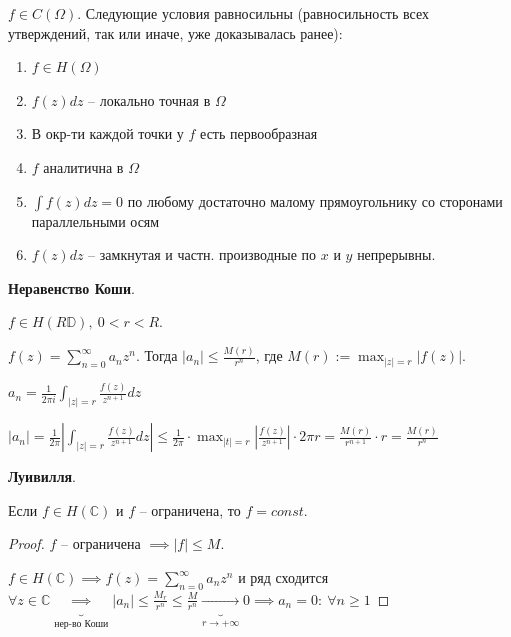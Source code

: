\begin{theorem}
    $f \in C(\Omega)$. Следующие условия равносильны (равносильность всех утверждений, так или иначе, уже доказывалась ранее):

    \begin{enumerate}
        \item {
            $f \in H(\Omega)$
        }
        \item {
            $f(z) dz$ -- локально точная в $\Omega$
        }
        \item {
            В окр-ти каждой точки у $f$ есть первообразная
        }
        \item {
            $f$ аналитична в $\Omega$
        }
        \item {
            $\int{f(z) dz} = 0$ по любому достаточно малому прямоугольнику со сторонами параллельными осям
        }
        \item {
            $f(z) dz$ -- замкнутая и частн. производные по $x$ и $y$ непрерывны.
        }
    \end{enumerate}
\end{theorem}

\begin{theorem}
    \textbf{Неравенство Коши}.

    $f \in H(R \mathbb{D}), \ 0 < r < R$.

    $f(z) = \sum_{n=0}^{\infty} {a_n z^n}$. Тогда $|a_n| \leq \frac{M(r)}{r^n}$, где $M(r) := \max_{|z| = r} |f(z)|$.
\end{theorem}
\begin{theorem}
    $a_n = \frac{1}{2 \pi i} \int_{|z| = r} { \frac{f(z)}{z^{n + 1}} dz }$

    $|a_n| = \frac{1}{2 \pi} \left| \int_{|z| = r} { \frac{f(z)}{z^{n+1}} dz } \right| \leq \frac{1}{2 \pi} \cdot \max_{|t| = r} \left|\frac{f(z)}{z^{n+1}}\right| \cdot 2 \pi r = \frac{M(r)}{r^{n + 1}} \cdot r = \frac{M(r)}{r^n}$
\end{theorem}

\begin{theorem}
    \textbf{Луивилля}.

    Если $f \in H(\mathbb{C})$ и $f$ -- ограничена, то $f = const$.
\end{theorem}
\begin{proof}
    $f$ -- ограничена $\implies |f| \leq M$.

    $f \in H(\mathbb{C}) \implies f(z) = \sum_{n=0}^{\infty} { a_n z^{n} }$ и ряд сходится $\forall z \in \mathbb{C} \underbrace{\implies}_{\text{нер-во Коши}} |a_n| \leq \frac{M_r}{r^n} \leq \frac{M}{r^n} \underbrace{\rightarrow}_{r \rightarrow +\infty} 0 \implies a_n = 0: \ \forall n \geq 1$
\end{proof}

